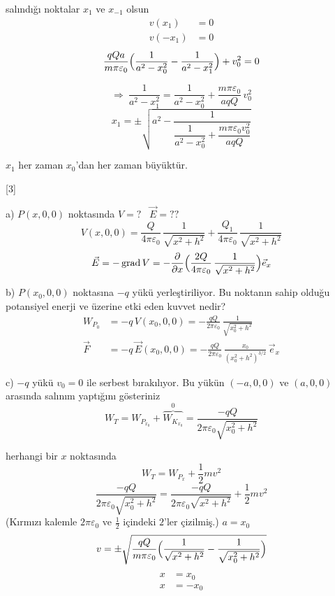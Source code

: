 \documentclass[11pt,a4paper]{article}
\begin{document}
\noindent salındığı noktalar $x_1$ ve $x_{-1}$ olsun
\begin{align*}
  v(x_1) &= 0 \\
  v(-x_1) &= 0
\end{align*}
\[ \frac{qQa}{m\pi\varepsilon_0}\Bigl(\frac{1}{a^2-x_0^2}-\frac{1}{a^2-x_1^2}\Bigr)+v_0^2=0 \]

\[ \Rightarrow\ \frac{1}{a^2-x_1^2}=\frac{1}{a^2-x_0^2}+\frac{m\pi\varepsilon_0}{aqQ}\,v_0^2 \]
\[ x_1=\pm\sqrt{a^2-\frac{1}{\dfrac{1}{a^2-x_0^2}+\dfrac{m\pi\varepsilon_0 v_0^2}{aqQ}}} \]

\noindent $x_1$ her zaman $x_0$'dan her zaman büyüktür.

\medskip
{}

[3]

\noindent a) $P(x,0,0)$ noktasında \quad $V=?$ \ $\vec E=??$
\[ V(x,0,0)=\frac{Q}{4\pi\varepsilon_0}\,\frac{1}{\sqrt{x^2+h^2}}+\frac{Q_1}{4\pi\varepsilon_0}\,\frac{1}{\sqrt{x^2+h^2}} \]
\[ \vec E=-\operatorname{grad}V=-\frac{\partial}{\partial x}\Bigl(\frac{2Q}{4\pi\varepsilon_0}\,\frac{1}{\sqrt{x^2+h^2}}\Bigr)\vec e_x \]

\noindent b) $P(x_0,0,0)$ noktasına $-q$ yükü yerleştiriliyor. Bu noktanın sahip olduğu potansiyel enerji ve üzerine etki eden kuvvet nedir?
\begin{align*}
  W_{P_0} &= -q\,V(x_0,0,0) = -\frac{qQ}{2\pi\varepsilon_0}\,\frac{1}{\sqrt{x_0^2+h^2}} \\
  \vec F &= -q\,\vec E(x_0,0,0) = -\frac{qQ}{2\pi\varepsilon_0}\,\frac{x_0}{(x_0^2+h^2)^{3/2}}\,\vec e_x
\end{align*}

\noindent c) $-q$ yükü $v_0=0$ ile serbest bırakılıyor. Bu yükün $(-a,0,0)$ ve $(a,0,0)$ arasında salınım yaptığını gösteriniz
\[ W_T=W_{P_{x_0}}+\overbrace{W_{K_{x_0}}}^{0}=\frac{-qQ}{2\pi\varepsilon_0\sqrt{x_0^2+h^2}} \]

\noindent herhangi bir $x$ noktasında
\[ W_T=W_{P_x}+\frac{1}{2}mv^2 \]
\[ \frac{-qQ}{2\pi\varepsilon_0\sqrt{x_0^2+h^2}}=\frac{-qQ}{2\pi\varepsilon_0\sqrt{x^2+h^2}}+\frac{1}{2}mv^2 \]
(Kırmızı kalemle $2\pi\varepsilon_0$ ve $\tfrac{1}{2}$ içindeki $2$'ler çizilmiş.) \qquad $a=x_0$
\[ v=\pm\sqrt{\frac{qQ}{m\pi\varepsilon_0}\Bigl(\frac{1}{\sqrt{x^2+h^2}}-\frac{1}{\sqrt{x_0^2+h^2}}\Bigr)} \]
\begin{align*}
  x &= x_0 \\
  x &= -x_0
\end{align*}
\end{document}
